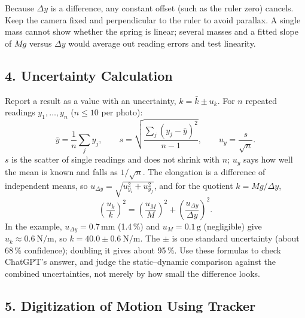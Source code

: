 \documentclass[12pt,a4paper]{article}
\begin{document}
Because $\Delta y$ is a difference, any constant offset (such as the ruler zero) cancels. Keep the camera fixed and perpendicular to the ruler to avoid parallax. A single mass cannot show whether the spring is linear; several masses and a fitted slope of $Mg$ versus $\Delta y$ would average out reading errors and test linearity.

\subsection*{4. Uncertainty Calculation}

Report a result as a value with an uncertainty, $k=\bar k\pm u_k$. For $n$ repeated readings $y_1,\dots,y_n$ ($n\le10$ per photo):
\[
\bar y=\frac1n\sum_{j}y_j,\qquad
s=\sqrt{\frac{\sum_j(y_j-\bar y)^2}{n-1}},\qquad
u_y=\frac{s}{\sqrt n}.
\]
$s$ is the scatter of single readings and does not shrink with $n$; $u_y$ says how well the mean is known and falls as $1/\sqrt n$. The elongation is a difference of independent means, so $u_{\Delta y}=\sqrt{u_{y_i}^2+u_{y_f}^2}$, and for the quotient $k=Mg/\Delta y$,
\[
\left(\frac{u_k}{k}\right)^2=\left(\frac{u_M}{M}\right)^2+\left(\frac{u_{\Delta y}}{\Delta y}\right)^2 .
\]
In the example, $u_{\Delta y}=0.7\,\text{mm}$ (1.4\,\%) and $u_M=0.1\,\text{g}$ (negligible) give $u_k\approx0.6\ \text{N/m}$, so $k=40.0\pm0.6\ \text{N/m}$. The $\pm$ is one standard uncertainty (about 68\,\% confidence); doubling it gives about 95\,\%. Use these formulas to check ChatGPT's answer, and judge the static--dynamic comparison against the combined uncertainties, not merely by how small the difference looks.

\subsection*{5. Digitization of Motion Using Tracker}
\end{document}
